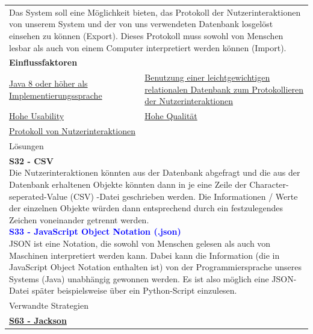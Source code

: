 \documentclass[enabledeprecatedfontcommands,fontsize=11pt,paper=a4,twoside]{scrartcl}
\newcounter{one}
\newcommand{\cb}[1]{{\textcolor{blue}{#1}}}
\begin{document}
	\newpage
	\begin{tabular} {|p{8cm} p{8cm}|}
		\hline
		\rowcolor{prob}\multicolumn{2}{|l|}{\parbox{16cm}{\textbf{12: Protokoll der Nutzerinteraktionen exportieren/ importieren}}} \\  \hline\hline 
		\multicolumn{2}{|l|}{\parbox{16cm}{Das System soll eine Möglichkeit bieten, das Protokoll der Nutzerinteraktionen von unserem System und der von uns verwendeten Datenbank losgelöst einsehen zu können (Export). Dieses Protokoll muss sowohl von Menschen lesbar als auch von einem Computer interpretiert werden können (Import).}}\rule{0pt}{7ex}\\ [4ex] \hline
		\multicolumn{2}{|l|}{\textbf{Einflussfaktoren}}\\
		\hyperlink{b}{Java 8 oder höher als Implementierungssprache} &
		\hyperlink {d}{Benutzung einer leichtgewichtigen relationalen Datenbank zum Protokollieren der Nutzerinteraktionen}\\ 
		\hyperlink {g}{Hohe Usability}&
		\hyperlink {h}{Hohe Qualität}\\
		\hyperlink {bb}{Protokoll von Nutzerinteraktionen} &
		\\ \hline
		\multicolumn{2}{|l|}{Lösungen} \\
		\multicolumn{2}{|l|}{\parbox{16cm}{
				\textbf{S32 - CSV} \\
				Die Nutzerinteraktionen könnten aus der Datenbank abgefragt und die aus der Datenbank erhaltenen Objekte könnten dann in je eine Zeile der Character-seperated-Value (CSV) -Datei geschrieben werden. Die Informationen / Werte der einzelnen Objekte würden dann entsprechend durch ein festzulegendes Zeichen voneinander getrennt werden. \\
				\textbf{\cb{\hypertarget{jjj}{S33 - JavaScript Object Notation (.json)}}} \\
				JSON ist eine Notation, die sowohl von Menschen gelesen als auch von Maschinen interpretiert werden kann. Dabei kann die Information (die in JavaScript Object Notation enthalten ist) von der Programmiersprache unseres Systems (Java) unabhängig gewonnen werden. Es ist also möglich eine JSON-Datei später beispielsweise über ein Python-Script einzulesen.
		} }\\ \hline
		\multicolumn{2}{|l|}{Verwandte Strategien} \\
		\textbf{\hyperlink{www}{S63 - Jackson}}&
		\\\hline
	\end{tabular}\\ \\ \\
\end{document}
